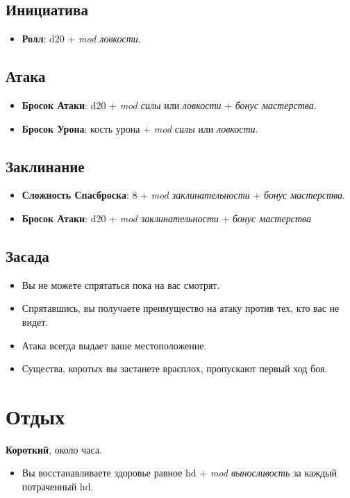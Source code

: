 \documentclass[a4paper,landscape,12pt]{book}
\begin{document}
\begin{multicols}{3}
\subsection{Инициатива}
\begin{itemize}
    \item \textbf{Ролл}: d20 + \textit{mod ловкости}.
\end{itemize}

\subsection{Атака}
\begin{itemize}
    \item \textbf{Бросок Атаки}: d20 + \textit{mod силы} или \textit{ловкости} + \textit{бонус мастерства}.
    \item \textbf{Бросок Урона}: кость урона + \textit{mod силы} или \textit{ловкости}.
\end{itemize}

\subsection{Заклинание}
\begin{itemize}
    \item \textbf{Сложность Спасброска}: 8 + \textit{mod заклинательности} + \textit{бонус мастерства}.
    \item \textbf{Бросок Атаки}: d20 + \textit{mod заклинательности} + \textit{бонус мастерства}
\end{itemize}

\subsection{Засада}
\begin{itemize}
    \item Вы не можете спрятаться пока на вас смотрят.
    \item Спрятавшись, вы получаете преимущество на атаку против тех, кто вас не видет.
    \item Атака всегда выдает ваше местоположение.
    \item Существа, коротых вы застанете врасплох, пропускают первый ход боя.
\end{itemize}

\section{Отдых}
\textbf{Короткий}, около часа.
\begin{itemize}
    \item Вы восстанавливаете здоровье равное hd + \textit{mod выносливость} за каждый потраченный hd.
\end{itemize}


\end{multicols}
\end{document}
